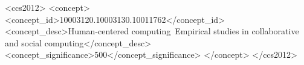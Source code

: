 \documentclass[acmsmall]{acmart}
\begin{document}
\begin{CCSXML}
<ccs2012>
   <concept>
       <concept_id>10003120.10003130.10011762</concept_id>
       <concept_desc>Human-centered computing~Empirical studies in collaborative and social computing</concept_desc>
       <concept_significance>500</concept_significance>
       </concept>
 </ccs2012>
\end{CCSXML}




\maketitle















\appendix

\end{document}
